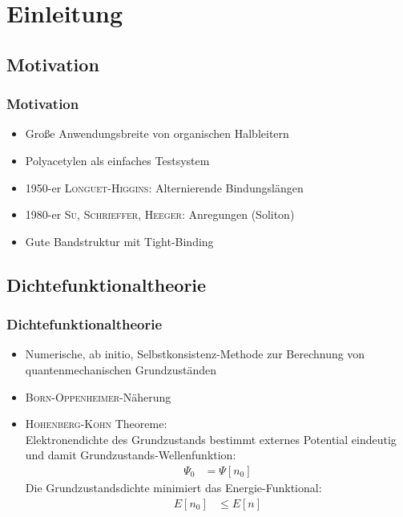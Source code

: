 \section{Einleitung}
\subsection{Motivation}
\begin{frame}
\frametitle{Motivation}
\begin{itemize}
\item Große Anwendungsbreite von organischen Halbleitern
\item Polyacetylen als einfaches Testsystem
\item 1950-er \textsc{Longuet-Higgins}: Alternierende Bindungslängen
\item 1980-er \textsc{Su, Schrieffer, Heeger}: Anregungen (Soliton)
\item Gute Bandstruktur mit Tight-Binding
\end{itemize}

\centering
{}
\end{frame}

\subsection{Dichtefunktionaltheorie}
\begin{frame}
\frametitle{Dichtefunktionaltheorie}
\begin{itemize}
\item Numerische, ab initio, Selbstkonsistenz-Methode zur Berechnung von quantenmechanischen Grundzuständen
\item \textsc{Born-Oppenheimer}-Näherung
\item \textsc{Hohenberg-Kohn} Theoreme:\\
Elektronendichte des Grundzustands bestimmt externes Potential eindeutig und damit Grundzustands-Wellenfunktion:
\begin{align*}
\Psi_0 &= \Psi\left[n_0\right]
\end{align*}
Die Grundzustandsdichte minimiert das Energie-Funktional:
\begin{align*}
E[n_0] &\le E[n]
\end{align*}
\end{itemize}
\end{frame}

